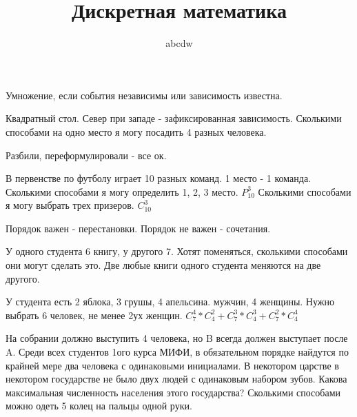 \documentclass[12pt]{article}
\title{Дискретная математика}
\date{}
\author{abcdw}
\begin{document}
    \maketitle

    Умножение, если события независимы или зависимость известна. \newline

    Квадратный стол. Север при западе - зафиксированная зависимость.
    Сколькими способами на одно место я могу посадить 4 разных человека. \newline

    Разбили, переформулировали - все ок. \newline

    В первенстве по футболу играет 10 разных команд. 1 место - 1 команда. Сколькими способами я могу определить 1, 2, 3 место. $P_{10}^{3}$ \newline
    Сколькими способами я могу выбрать трех призеров. $C_{10}^{3}$ \newline

    Порядок важен - перестановки. Порядок не важен - сочетания. \newline

    У одного студента 6 книгу, у другого 7. Хотят поменяться, сколькими способами они могут сделать это. \newline
    Две любые книги одного студента меняются на две другого. \newline

    У студента есть 2 яблока, 3 грушы, 4 апельсина.  мужчин, 4 женщины. Нужно выбрать 6 человек, не менее 2ух женщин. $C_7^4 * C_4^2 + C_7^3 * C_4^3 + C_7^2 * C_4^4$ \newline

    На собрании должно выступить 4 человека, но B всегда должен выступает после A. \newline
    Среди всех студентов 1ого курса МИФИ, в обязательном порядке найдутся по крайней мере два человека с одинаковыми инициалами. \newline
    В некотором царстве в некотором государстве не было двух людей с одинаковым набором зубов. Какова максимальная численность населения этого государства? \newline
    Сколькими способами можно одеть 5 колец на пальцы одной руки. \newline
\end{document}
